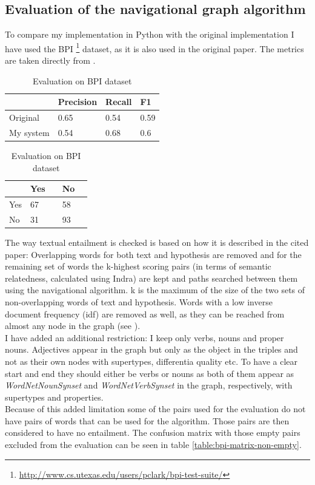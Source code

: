\subsection{Evaluation of the navigational graph algorithm}
To compare my implementation in Python with the original implementation I have used the BPI \footnote{\url{http://www.cs.utexas.edu/users/pclark/bpi-test-suite/}} dataset, as it is also used in the original paper. The metrics are taken directly from \cite{silva2018recognizing}.
\begin{table}[!htb]
    \begin{minipage}{.5\linewidth}
        \caption{Confusion matrix for BPI dataset}
        \label{table:bpi-eval}
        \begin{tabular}{llll}
             & Precision & Recall & F1 \\ \hline
            Original & 0.65  & 0.54 & 0.59  \\ \hline
            My system & 0.54 & 0.68 & 0.6 \\
        \end{tabular}
    \end{minipage}%
    \begin{minipage}{.5\linewidth}
        \centering
        \caption{Evaluation on BPI dataset}
        \label{table:bpi-matrix}
        \begin{tabular}{l|llll}
            & Yes &  & No &  \\ \hline
            Yes & 67 &  & 58 &  \\
            No & 31 &  & 93 & 
        \end{tabular}
    \end{minipage} 
\end{table}

The way textual entailment is checked is based on how it is described in the cited paper: Overlapping words for both text and hypothesis are removed and for the remaining set of words the k-highest scoring pairs (in terms of semantic relatedness, calculated using Indra) are kept and paths searched between them using the navigational algorithm. k is the maximum of the size of the two sets of non-overlapping words of text and hypothesis. Words with a low inverse document frequency (idf) are removed as well, as they can be reached from almost any node in the graph (see \cite{silva2018recognizing}).\\
I have added an additional restriction: I keep only verbs, nouns and proper nouns. Adjectives appear in the graph but only as the object in the triples and not as their own nodes with supertypes, differentia quality etc. To have a clear start and end they should either be verbs or nouns as both of them appear as \textit{WordNetNounSynset} and \textit{WordNetVerbSynset} in the graph, respectively, with supertypes and properties.\\
Because of this added limitation some of the pairs used for the evaluation do not have pairs of words that can be used for the algorithm. Those pairs are then considered to have no entailment. The confusion matrix with those empty pairs excluded from the evaluation can be seen in table \ref{table:bpi-matrix-non-empty}.

